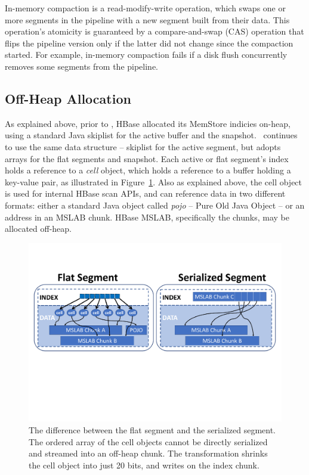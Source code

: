 In-memory compaction is a read-modify-write operation, which swaps one or more segments in the pipeline 
with a new segment built from their data. This operation's atomicity is guaranteed by a compare-and-swap (CAS) operation
that flips the pipeline version only if the latter did not change since the compaction started.  For example, in-memory
compaction fails if a disk flush concurrently removes some segments from the pipeline.


\subsection{Off-Heap  Allocation} \label{ssec:offheap}
As explained above, prior to \sys, HBase allocated its MemStore indicies on-heap, using a standard Java skiplist for the active buffer and the snapshot. \sys\ continues to use the same data structure -- skiplist for the active segment, but adopts arrays for the flat segments and snapshot. 
Each active or flat segment's index holds a reference to a \emph{cell} object, which holds a reference to a buffer holding a key-value pair,
as illustrated in Figure~\ref{fig:on-heap}. 
Also as explained above, the cell object is used for internal HBase scan APIs, and can reference data in two different formats: either a standard Java object
called \emph{pojo} -- Pure Old Java Object -- or an address in an MSLAB chunk. HBase MSLAB, specifically the chunks, may be allocated off-heap. 

\begin{figure}[tbh]
\center
\includegraphics[width=0.9\columnwidth]{serializing.pdf} 
\caption{The difference between the flat segment and the serialized segment. The ordered array of the cell objects cannot be directly serialized and streamed into an off-heap chunk. The transformation shrinks the cell object into just 20 bits, and writes on the index chunk.}
\label{fig:on-heap}
\end{figure}

